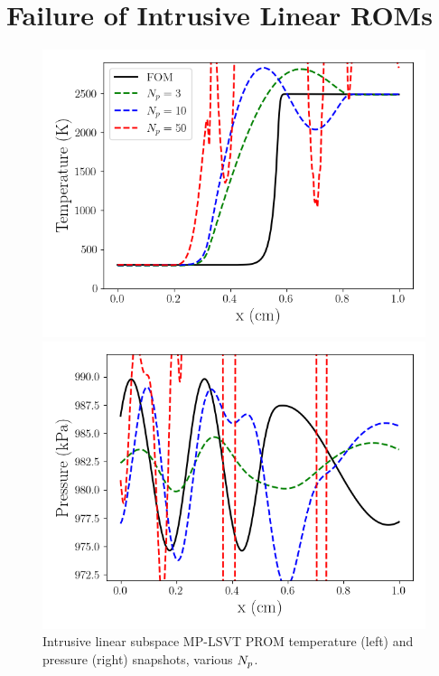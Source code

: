 \section{Failure of Intrusive Linear ROMs}

\begin{figure}
    \begin{minipage}{0.49\linewidth}
        \includegraphics[width=0.99\linewidth]{Chapters/TransientFlame/Images/linear/rom_temp_snaps.png}
    \end{minipage}
    \begin{minipage}{0.49\linewidth}
        \includegraphics[width=0.99\linewidth]{Chapters/TransientFlame/Images/linear/rom_press_snaps.png}
    \end{minipage}
    \caption{Intrusive linear subspace MP-LSVT PROM temperature (left) and pressure (right) snapshots, various $N_p$.}
\end{figure}

